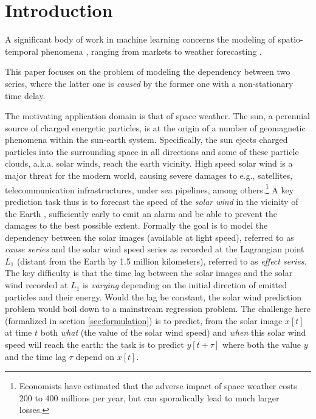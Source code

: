 \section{Introduction}
A significant body of work in machine learning concerns the modeling of spatio-temporal phenomena \cite{SurveyST}, 
ranging from markets \cite{Pedreschi} to weather forecasting \cite{Horvitz}.

This paper focuses on the problem of modeling the dependency between two series, 
where the latter one is {\em caused} by the former one \cite{Granger} with a non-stationary time delay. 

The motivating application domain is that of space weather.
The sun, a perennial source of charged energetic particles, is at the origin of a number of geomagnetic phenomena within the sun-earth system. 
Specifically, the sun ejects charged particles into the surrounding space in all directions and some of these particle clouds, a.k.a. solar winds, reach the earth vicinity. High speed solar wind is a major threat for the modern world, causing severe damages to e.g., satellites, telecommunication infrastructures, under sea pipelines, among others.\footnote{Economists have estimated that the adverse impact of space weather costs 200 to 400 millions per year, but can sporadically lead to much larger losses.} 
A key prediction task thus is to forecast the speed of the \emph{solar wind} in 
the vicinity of the Earth \cite{doi:10.1002/jgra.50429,doi:10.1029/2009SW000542}, sufficiently early to emit an alarm and be able to prevent the damages to the best possible extent.
Formally the goal is to model the dependency between the solar images (available at light speed), referred to as {\em cause series} 
and the solar wind speed series as recorded at the Lagrangian point $L_1$ (distant from the Earth by 1.5 million kilometers), referred to as {\em effect series}. 
The key difficulty is that the time lag between the solar images and the solar wind recorded at $L_1$ is {\em varying} depending on the initial direction of emitted particles and their energy. Would the lag be constant, the solar wind prediction problem would boil down to a mainstream regression problem. The challenge here (formalized in section \ref{sec:formulation})
is to predict, from the solar image $x[t]$ at time $t$ both {\em what} (the value of the solar wind speed) and {\em when} this solar wind speed will reach the earth: the task is to predict $y[t + \tau]$ where both the value $y$ and the time lag $\tau$ depend on $x[t]$. 



